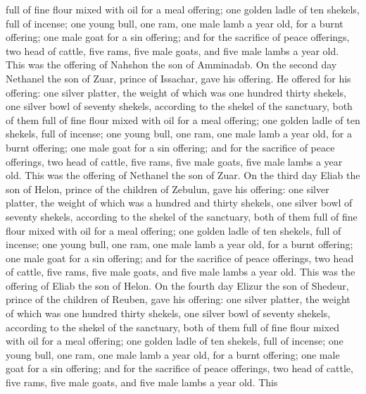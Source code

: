 full of fine flour mixed with oil for a meal offering; 
one golden ladle of ten shekels, full of incense;  one
young bull, one ram, one male lamb a year old, for a burnt offering;
 one male goat for a sin offering;  and
for the sacrifice of peace offerings, two head of cattle, five rams,
five male goats, and five male lambs a year old. This was the offering
of Nahshon the son of Amminadab.  On the second day
Nethanel the son of Zuar, prince of Issachar, gave his offering.
 He offered for his offering: one silver platter, the
weight of which was one hundred thirty shekels, one silver bowl of
seventy shekels, according to the shekel of the sanctuary, both of them
full of fine flour mixed with oil for a meal offering; 
one golden ladle of ten shekels, full of incense;  one
young bull, one ram, one male lamb a year old, for a burnt offering;
 one male goat for a sin offering;  and
for the sacrifice of peace offerings, two head of cattle, five rams,
five male goats, five male lambs a year old. This was the offering of
Nethanel the son of Zuar.  On the third day Eliab the son
of Helon, prince of the children of Zebulun,  gave his
offering: one silver platter, the weight of which was a hundred and
thirty shekels, one silver bowl of seventy shekels, according to the
shekel of the sanctuary, both of them full of fine flour mixed with oil
for a meal offering;  one golden ladle of ten shekels,
full of incense;  one young bull, one ram, one male lamb
a year old, for a burnt offering;  one male goat for a
sin offering;  and for the sacrifice of peace offerings,
two head of cattle, five rams, five male goats, and five male lambs a
year old. This was the offering of Eliab the son of Helon.
 On the fourth day Elizur the son of Shedeur, prince of
the children of Reuben,  gave his offering: one silver
platter, the weight of which was one hundred thirty shekels, one silver
bowl of seventy shekels, according to the shekel of the sanctuary, both
of them full of fine flour mixed with oil for a meal offering;
 one golden ladle of ten shekels, full of incense;
 one young bull, one ram, one male lamb a year old, for a
burnt offering;  one male goat for a sin offering;
 and for the sacrifice of peace offerings, two head of
cattle, five rams, five male goats, and five male lambs a year old. This
